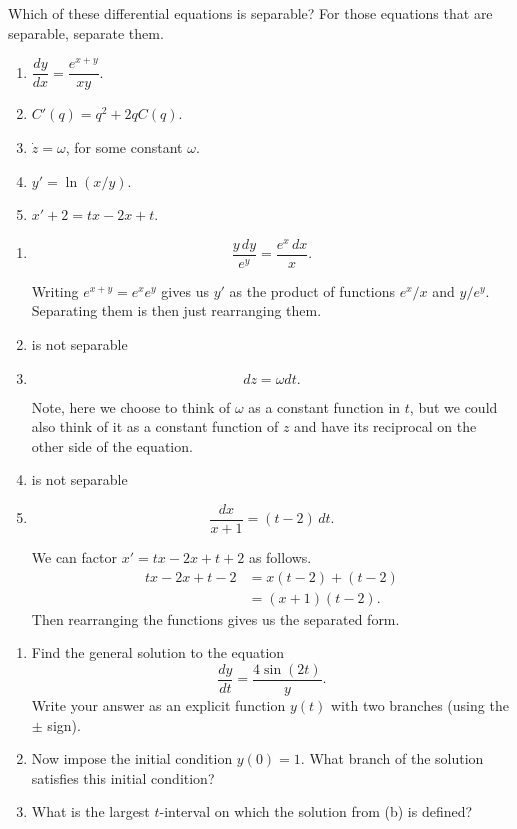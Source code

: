 \documentclass[12 pt, letterpaper]{hmcpset}
\begin{document}
\begin{problem}[1:]
	Which of these differential equations is separable? For those equations that are separable, separate them.
	\begin{enumerate}
		\item $\dfrac{dy}{dx} = \dfrac{e^{x + y}}{xy}$.
		\item $C'(q) = q^{2} + 2q C(q)$.
		\item $\dot{z} = \omega$, for some constant $\omega$.
		\item $y' = \ln(x/y)$.
		\item $x' + 2 = tx - 2x + t$.
	\end{enumerate}
\end{problem}

\begin{solution}
	\begin{enumerate}
		\item 
			\[
				\boxed{
					\frac{y \, dy}{e^{y}} = \frac{e^{x} \, dx}{x}.
				}
			\]

			Writing $e^{x + y} = e^{x} e^{y}$ gives us $y'$ as the product of functions $e^{x}/x$ and $y/e^{y}$. Separating them is then just rearranging them.
		\item is not separable
		\item
			\[
				\boxed{
					dz = \omega dt.
				}
			\]

			Note, here we choose to think of $\omega$ as a constant function in $t$, but we could also think of it as a constant function of $z$ and have its reciprocal on the other side of the equation.
		\item is not separable
		\item
			\[
				\boxed{
					\frac{dx}{x + 1} = (t - 2) \, dt.
				}
			\]
			
			We can factor $x' = tx - 2x + t + 2$ as follows.
			\[
				\begin{split}
					tx - 2x + t - 2 & = x(t - 2) + (t - 2) \\
							& = (x + 1)(t - 2).
				\end{split}
			\]
			Then rearranging the functions gives us the separated form.
	\end{enumerate}
\end{solution}

\pagebreak

\begin{problem}[2:]
	\begin{enumerate}
		\item Find the general solution to the equation
			\[
				\frac{dy}{dt} = \frac{4 \sin{(2t)}}{y}.
			\]
			Write your answer as an explicit function $y(t)$ with two branches (using the $\pm$ sign).
		\item Now impose the initial condition $y(0) = 1$. What branch of the solution satisfies this initial condition?
		\item What is the largest $t$-interval on which the solution from (b) is defined?
	\end{enumerate}
\end{problem}
\end{document}

